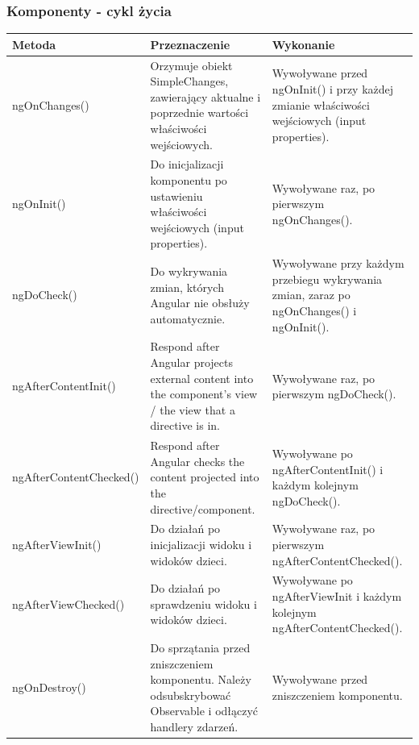 \documentclass{beamer}
\begin{document}
\begin{frame}
    \frametitle{Komponenty - cykl życia}
\tiny
\begin{tabularx}{\textwidth}{l | X | X}
Metoda & Przeznaczenie & Wykonanie \\
\hline \hline
ngOnChanges() & Orzymuje obiekt SimpleChanges, zawierający aktualne i poprzednie wartości właściwości wejściowych. & Wywoływane przed ngOnInit() i przy każdej zmianie właściwości wejściowych (input properties).\\
ngOnInit() & Do inicjalizacji komponentu po ustawieniu właściwości wejściowych (input properties). & Wywoływane raz, po pierwszym ngOnChanges().\\
ngDoCheck() & Do wykrywania zmian, których Angular nie obsłuży automatycznie. & Wywoływane przy każdym przebiegu wykrywania zmian, zaraz po ngOnChanges() i ngOnInit().\\
ngAfterContentInit() & Respond after Angular projects external content into the component's view / the view that a directive is in. & Wywoływane raz, po pierwszym ngDoCheck().\\
ngAfterContentChecked()	& Respond after Angular checks the content projected into the directive/component. & Wywoływane po ngAfterContentInit() i każdym kolejnym ngDoCheck().\\
ngAfterViewInit() & Do działań po inicjalizacji widoku i widoków dzieci. & Wywoływane raz, po pierwszym ngAfterContentChecked().\\
ngAfterViewChecked() & Do działań po sprawdzeniu widoku i widoków dzieci. & Wywoływane po ngAfterViewInit i każdym kolejnym ngAfterContentChecked().\\
ngOnDestroy() & Do sprzątania przed zniszczeniem komponentu. Należy odsubskrybować Observable i odłączyć handlery zdarzeń. & Wywoływane przed zniszczeniem komponentu.\\
\end{tabularx}
\end{frame}
\end{document}
